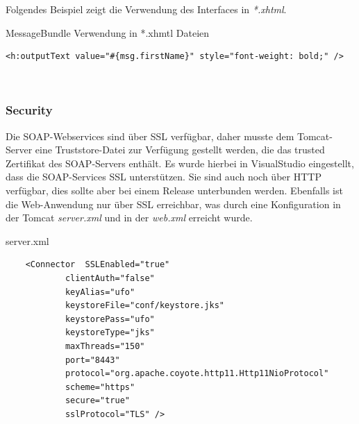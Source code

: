 \documentclass[11pt, a4paper, twoside]{article}   	%
\begin{document}
\newline
\newline
Folgendes Beispiel zeigt die Verwendung des Interfaces  in \emph{*.xhtml}.
\begin{listing}[H]    
\caption{MessageBundle Verwendung in *.xhmtl Dateien}   
\begin{verbatim}
<h:outputText value="#{msg.firstName}" style="font-weight: bold;" />
\end{verbatim}
\end{listing}
\ \newpage

\subsubsection{Security}
Die SOAP-Webservices sind über SSL verfügbar, daher musste dem Tomcat-Server eine Truststore-Datei zur Verfügung gestellt werden, die das trusted Zertifikat des SOAP-Servers enthält. Es wurde hierbei in VisualStudio eingestellt, dass die SOAP-Services SSL unterstützen. Sie sind auch noch über HTTP verfügbar, dies sollte aber bei einem Release unterbunden werden. Ebenfalls ist die Web-Anwendung nur über SSL erreichbar, was durch eine Konfiguration in der Tomcat \emph{server.xml} und in der \emph{web.xml} erreicht wurde.
\begin{listing}[H]    
\caption{server.xml}    
\begin{verbatim}
	<Connector  SSLEnabled="true" 
			clientAuth="false" 
			keyAlias="ufo"
			keystoreFile="conf/keystore.jks" 
			keystorePass="ufo" 
			keystoreType="jks"
			maxThreads="150" 
			port="8443" 
			protocol="org.apache.coyote.http11.Http11NioProtocol"
			scheme="https" 
			secure="true" 
			sslProtocol="TLS" />
\end{verbatim}
\end{listing}
\end{document}
